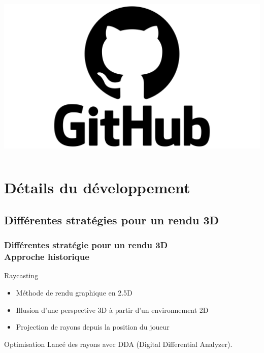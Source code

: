 \documentclass{beamer}
\begin{document}
\begin{frame}
\begin{columns}
        \centering
        \includegraphics[width=\textwidth]{images/github.png}
    \end{columns}
\end{frame}

\section{Détails du développement}
\subsection{Différentes stratégies pour un rendu 3D}

\begin{frame}
    \frametitle{Différentes stratégie pour un rendu 3D \\
                \small Approche historique}
    \begin{block}{Raycasting}
        \begin{itemize}
            \item Méthode de rendu graphique en 2.5D
            \item Illusion d'une perspective 3D à partir d'un environnement 2D
            \item Projection de rayons depuis la position du joueur
        \end{itemize}
    \end{block}
    \begin{block}{Optimisation}
        Lancé des rayons avec DDA (Digital Differential Analyzer).
    \end{block}
\end{frame}
\end{document}
